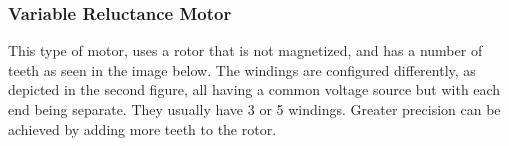 \begin{figure}[htp]
    \begin{center}
    \hfill
    \hfill
  	\hfill
    \end{center}
\end{figure}

\subsubsection{Variable Reluctance Motor}
This type of motor, uses a rotor that is not magnetized, and has a number of teeth as seen in the image below. The windings are configured differently, as depicted in the second figure, all having a common voltage source but with each end being separate. They usually have 3 or 5 windings. Greater precision can be achieved by adding more teeth to the rotor.

